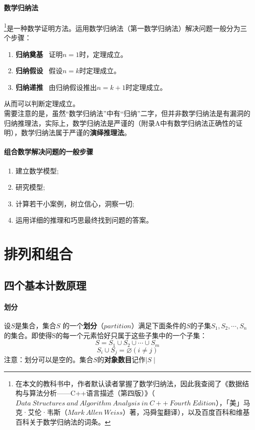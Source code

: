 \documentclass{ctexart}
\begin{document}
    \paragraph{数学归纳法}\footnote{在本文的教科书中，作者默认读者掌握了数学归纳法，因此我查阅了《数据结构与算法分析——C++语言描述（第四版）》（$Data  \ Structures \ and \ Algorithm \ Analysis \ in \ C++ \ Fourth \ Edition$），「美」马克·艾伦·韦斯（$Mark \ Allen \ Weiss$）著，冯舜玺翻译），以及百度百科和维基百科关于数学归纳法的词条。}是一种数学证明方法。运用数学归纳法（第一数学归纳法）解决问题一般分为三个步骤：
    \begin{enumerate}
        \item \textbf{归纳奠基} \ 证明$n=1$时，定理成立。
        \item \textbf{归纳假设} \ 假设$n = k$时定理成立。
        \item \textbf{归纳递推} \ 由归纳假设推出$ n = k+1$时定理成立。
    \end{enumerate}
    从而可以判断定理成立。\\
    需要注意的是，虽然“数学归纳法”中有“归纳”二字，但并非数学归纳法是有漏洞的归纳推理法，实际上，数学归纳法是严谨的（附录A中有数学归纳法正确性的证明），数学归纳法属于严谨的\textbf{演绎推理法}。
    
    \paragraph{组合数学解决问题的一般步骤}
    \begin{enumerate}
        \item 建立数学模型;
        \item 研究模型;
        \item 计算若干小案例，树立信心，洞察一切;
        \item 运用详细的推理和巧思最终找到问题的答案。
    \end{enumerate}

    \section{排列和组合}
    \subsection{四个基本计数原理}
    \paragraph{划分} 设$S$是集合，集合$S$ 的一个\textbf{划分}（$partition$）满足下面条件的$S$的子集$S_1,S_2,\cdots , S_n$的集合。即使得S的每一个元素恰好只属于这些子集中的一个子集：
    \[S =  S_1 \cup S_2 \cup \cdots \cup S_m \]
    \[S_i \cup S_j = \varnothing (i \ne j)\]
    注意：划分可以是空的。集合$S$的\textbf{对象数目}记作$\mid S \mid$
\end{document}

